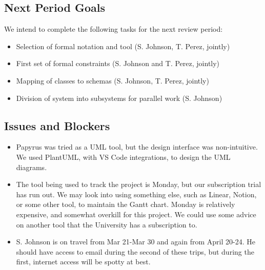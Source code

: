 \documentclass[conference]{IEEEtran}
\begin{document}
\subsection{Next Period Goals}
We intend to complete the following tasks for the next review period:

\begin{itemize}
    \item Selection of formal notation and tool (S. Johnson, T. Perez, jointly)
    \item First set of formal constraints (S. Johnson and T. Perez, jointly)
    \item Mapping of classes to schemas (S. Johnson, T. Perez, jointly)
    \item Division of system into subsystems for parallel work (S. Johnson)
\end{itemize}

\subsection{Issues and Blockers}
\begin{itemize}
    \item Papyrus was tried as a UML tool, but the design interface was non-intuitive. We used PlantUML, with VS Code integrations, to design the UML diagrams.
    \item The tool being used to track the project is Monday, but our subscription trial has run out. We may look into using something else, such as Linear, Notion, or some other tool, to maintain the Gantt chart. Monday is relatively expensive, and somewhat overkill for this project. We could use some advice on another tool that the University has a subscription to.
    \item S. Johnson is on travel from Mar 21-Mar 30 and again from April 20-24. He should have access to email during the second of these trips, but during the first, internet access will be spotty at best.
\end{itemize}
\end{document}
